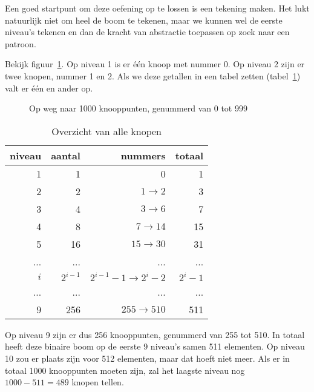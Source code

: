 \begin{Oplossing}{5.2}
Een goed startpunt om deze oefening op te lossen is een tekening maken. Het lukt natuurlijk niet om heel de boom te tekenen, maar we kunnen wel de eerste niveau's tekenen en dan de kracht van abstractie toepassen op zoek naar een patroon.

Bekijk figuur~\ref{fig:1000knopen}. Op niveau 1 is er één knoop met nummer 0. Op niveau 2 zijn er twee knopen, nummer 1 en 2. Als we deze getallen in een tabel zetten (tabel~\ref{tbl:1000knopen}) valt er één en ander op.
\begin{figure}[htbp]
    \centering
{}
\caption{Op weg naar 1000 knooppunten, genummerd van 0 tot 999}
    \label{fig:1000knopen}
\end{figure}

\begin{table}[ht]
  \centering
  \caption{Overzicht van alle knopen}
  \begin{tabular}{rrrr}
    \toprule
niveau & aantal & nummers & totaal \\
\midrule
1 & 1 & 0 & 1\\
2 & 2 & $1 \rightarrow 2$ & 3\\
3 & 4 & $3 \rightarrow 6$ & 7\\
4 & 8 & $7 \rightarrow 14$ & 15\\
5 & 16 & $15 \rightarrow 30$ & 31\\
... & ... & ... & ...\\
$i$ & $2^{i-1}$ & $2^{i-1}-1 \rightarrow 2^i-2$ & $2^i - 1$\\
... & ... & ... & ...\\
9 & 256 & $255 \rightarrow 510$ & 511\\
\bottomrule
  \end{tabular}
  \label{tbl:1000knopen}
\end{table}
Op niveau 9 zijn er dus 256 knooppunten, genummerd van 255 tot 510. In totaal heeft deze binaire boom op de eerste 9 niveau's samen 511 elementen. Op niveau 10 zou er plaats zijn voor 512 elementen, maar dat hoeft niet meer. Als er in totaal 1000 knooppunten moeten zijn, zal het laagste niveau nog $1000-511=489$ knopen tellen.


\end{Oplossing}
